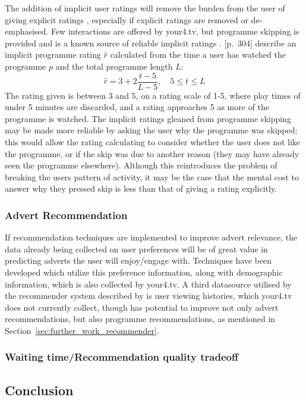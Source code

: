 		The addition of implicit user ratings will remove the burden from the user of giving explicit ratings \citep{implicit_indicators}, especially if explicit ratings are removed or de-emphasised. Few interactions are offered by your4.tv, but programme skipping is provided and is a known source of reliable implicit ratings \cite{}. \citep{recommender-systems-handbook}[p.~304] describe an implicit programme rating $\hat{r}$ calculated from the time a user has watched the programme $p$ and the total programme length $L$:
		$$
			\hat{r} = 3 + 2 \frac{t - 5}{L - 5},\quad 5 \leq t \leq L
		$$
The rating given is between 3 and 5, on a rating scale of 1-5, where play times of under 5 minutes are discarded, and a rating approaches 5 as more of the programme is watched. The implicit ratings gleaned from programme skipping may be made more reliable by asking the user why the programme was skipped; this would allow the rating calculating to consider whether the user does not like the programme, or if the skip was due to another reason (they may have already seen the programme elsewhere). Although this reintroduces the problem of breaking the users pattern of activity, it may be the case that the mental cost to answer why they pressed skip is less than that of giving a rating explicitly.

	\subsubsection{Advert Recommendation}

	If recommendation techniques are implemented to improve advert relevance, the data already being collected on user preferences will be of great value in predicting adverts the user will enjoy/engage with. Techniques have been developed \cite{contextual_advertising} which utilize this preference information, along with demographic \cite{contextual_advertising} information, which is also collected by your4.tv. A third datasource utilised by the recommender system described by \cite{contextual_advertising} is user viewing histories, which your4.tv does not currently collect, though has potential to improve not only advert recommendations, but also programme recommendations, as mentioned in Section~\ref{sec:further_work_recommender}.

	\subsubsection{Waiting time/Recommendation quality tradeoff}

	\subsection{Conclusion}

